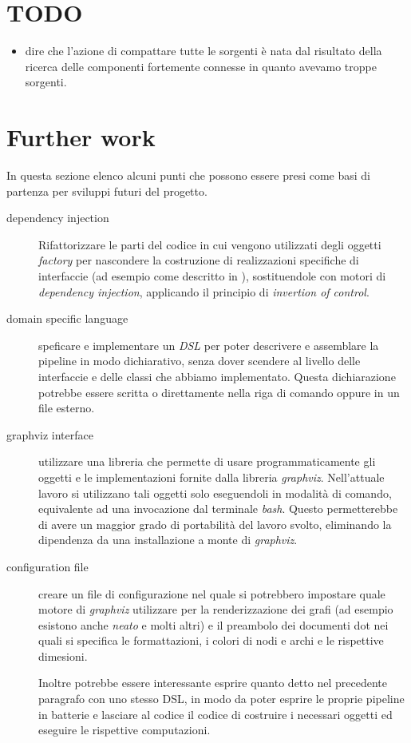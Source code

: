 
\section{TODO}
\begin{itemize}
\item dire che l'azione di compattare tutte le sorgenti \`e nata dal
  risultato della ricerca delle componenti fortemente connesse in
  quanto avevamo troppe sorgenti.
\end{itemize}

\section{Further work}

In questa sezione elenco alcuni punti che possono essere presi come
basi di partenza per sviluppi futuri del progetto. 

\begin{description}
\item[dependency injection] Rifattorizzare le parti del codice in cui
  vengono utilizzati degli oggetti \emph{factory} per nascondere la
  costruzione di realizzazioni specifiche di interfaccie (ad esempio
  come descritto in ),
  sostituendole con motori di \emph{dependency injection}, applicando
  il principio di \emph{invertion of control}.
\item[domain specific language] speficare e implementare un \emph{DSL}
  per poter descrivere e assemblare la pipeline in modo dichiarativo,
  senza dover scendere al livello delle interfaccie e delle classi che
  abbiamo implementato. Questa dichiarazione potrebbe essere scritta o
  direttamente nella riga di comando oppure in un file esterno.
\item[graphviz interface] utilizzare una libreria che permette di
  usare programmaticamente gli oggetti e le implementazioni fornite
  dalla libreria \emph{graphviz}. Nell'attuale lavoro si utilizzano
  tali oggetti solo eseguendoli in modalit\`a di comando, equivalente
  ad una invocazione dal terminale \emph{bash}. Questo permetterebbe
  di avere un maggior grado di portabilit\`a del lavoro svolto,
  eliminando la dipendenza da una installazione a monte di
  \emph{graphviz}.
\item[configuration file] creare un file di configurazione nel quale
  si potrebbero impostare quale motore di \emph{graphviz} utilizzare
  per la renderizzazione dei grafi (ad esempio esistono anche
  \emph{neato} e molti altri) e il preambolo dei documenti dot nei
  quali si specifica le formattazioni, i colori di nodi e archi e le
  rispettive dimesioni.

  Inoltre potrebbe essere interessante esprire quanto detto nel
  precedente paragrafo con uno stesso DSL, in modo da poter esprire le
  proprie pipeline in batterie e lasciare al codice il codice di
  costruire i necessari oggetti ed eseguire le rispettive
  computazioni.
\end{description}
